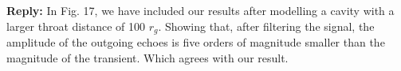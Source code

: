 \documentclass[preprintnumbers,floats,floatfix,amssymb,prd,onecolumn,superscriptaddress,nofootinbib]{revtex4}
\begin{document}
\textbf{Reply:} In Fig. 17, we have included our results after modelling a cavity with a larger throat distance of 100 $r_g$. Showing that, after filtering the signal, the amplitude of the outgoing echoes is five orders of magnitude smaller than the magnitude of the transient. Which agrees with our result.\\
\end{document}
